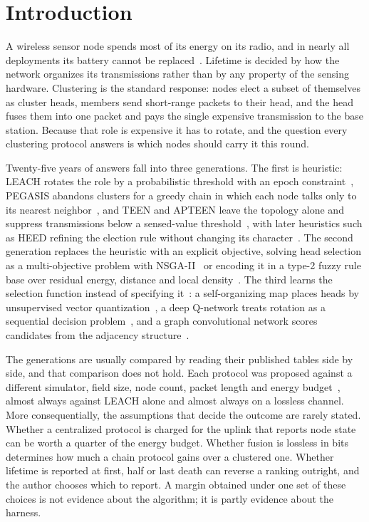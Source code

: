 \section{Introduction}
\label{sec:intro}

A wireless sensor node spends most of its energy on its radio, and in nearly all
deployments its battery cannot be replaced~\cite{akyildiz2002survey}. Lifetime
is decided by how the network organizes its transmissions rather than by any
property of the sensing hardware. Clustering is the standard response: nodes
elect a subset of themselves as cluster heads, members send short-range packets
to their head, and the head fuses them into one packet and pays the single
expensive transmission to the base station. Because that role is expensive it
has to rotate, and the question every clustering protocol answers is which nodes
should carry it this round.

Twenty-five years of answers fall into three generations. The first is
heuristic: LEACH rotates the role by a probabilistic threshold with an epoch
constraint~\cite{heinzelman2000leach}, PEGASIS abandons clusters for a greedy
chain in which each node talks only to its nearest
neighbor~\cite{lindsey2002pegasis}, and TEEN and APTEEN leave the topology alone
and suppress transmissions below a sensed-value
threshold~\cite{manjeshwar2001teen,manjeshwar2002apteen}, with later heuristics
such as HEED refining the election rule without changing its
character~\cite{younis2004heed,abbasi2007clustering}. The second generation
replaces the heuristic with an explicit objective, solving head selection as a
multi-objective problem with NSGA-II~\cite{deb2002nsga2} or encoding it in a
type-2 fuzzy rule base over residual energy, distance and local
density~\cite{mendel2002type2,karnik2001centroid}. The third learns the
selection function instead of specifying it~\cite{alsheikh2014ml}: a
self-organizing map places heads by unsupervised vector
quantization~\cite{kohonen1990som}, a deep Q-network treats rotation as a
sequential decision problem~\cite{mnih2015dqn,sutton2018rl}, and a graph
convolutional network scores candidates from the adjacency
structure~\cite{kipf2017gcn,wu2021gnnsurvey}.

The generations are usually compared by reading their published tables side by
side, and that comparison does not hold. Each protocol was proposed against a
different simulator, field size, node count, packet length and energy
budget~\cite{kurkowski2005incredibles,pawlikowski2002credibility,andel2006credibility},
almost always against LEACH alone and almost always on a lossless channel. More
consequentially, the assumptions that decide the outcome are rarely stated.
Whether a centralized protocol is charged for the uplink that reports node state
can be worth a quarter of the energy budget. Whether fusion is lossless in bits
determines how much a chain protocol gains over a clustered one. Whether
lifetime is reported at first, half or last death can reverse a ranking
outright, and the author chooses which to report. A margin obtained under one
set of these choices is not evidence about the algorithm; it is partly evidence
about the harness.

